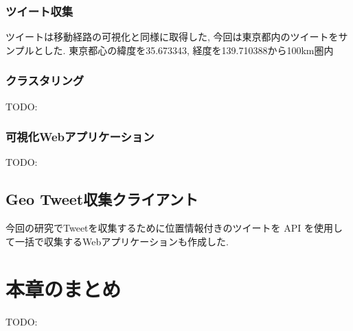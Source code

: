 \subsubsection{ツイート収集}
ツイートは移動経路の可視化と同様に取得した, 今回は東京都内のツイートをサンプルとした.
東京都心の緯度を35.673343, 経度を139.710388から100km圏内

\subsubsection{クラスタリング}
TODO:

\subsubsection{可視化Webアプリケーション}
TODO:

\subsection{Geo Tweet収集クライアント}
今回の研究でTweetを収集するために位置情報付きのツイートを API を使用して一括で収集するWebアプリケーションも作成した.


\newpage

\section{本章のまとめ}
TODO:




\newpage
